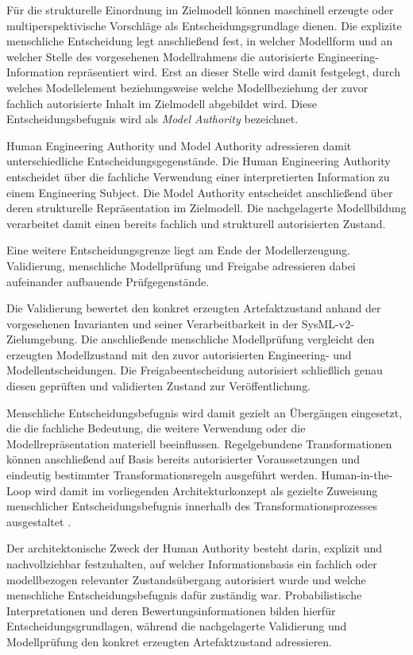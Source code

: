 Für die strukturelle Einordnung im Zielmodell können maschinell erzeugte oder
multiperspektivische Vorschläge als Entscheidungsgrundlage dienen. Die
explizite menschliche Entscheidung legt anschließend fest, in welcher
Modellform und an welcher Stelle des vorgesehenen Modellrahmens die
autorisierte Engineering-Information repräsentiert wird. Erst an dieser
Stelle wird damit festgelegt, durch welches Modellelement beziehungsweise
welche Modellbeziehung der zuvor fachlich autorisierte Inhalt im Zielmodell
abgebildet wird. Diese Entscheidungsbefugnis wird als
\emph{Model Authority} bezeichnet.

Human Engineering Authority und Model Authority adressieren damit
unterschiedliche Entscheidungsgegenstände. Die Human Engineering Authority
entscheidet über die fachliche Verwendung einer interpretierten Information
zu einem Engineering Subject. Die Model Authority entscheidet anschließend
über deren strukturelle Repräsentation im Zielmodell. Die nachgelagerte
Modellbildung verarbeitet damit einen bereits fachlich und strukturell
autorisierten Zustand.

Eine weitere Entscheidungsgrenze liegt am Ende der Modellerzeugung.
Validierung, menschliche Modellprüfung und Freigabe adressieren dabei
aufeinander aufbauende Prüfgegenstände. 

\noindent Die Validierung bewertet den konkret
erzeugten Artefaktzustand anhand der vorgesehenen Invarianten und seiner
Verarbeitbarkeit in der SysML-v2-Zielumgebung. Die anschließende menschliche
Modellprüfung vergleicht den erzeugten Modellzustand mit den zuvor
autorisierten Engineering- und Modellentscheidungen. Die
Freigabeentscheidung autorisiert schließlich genau diesen geprüften und
validierten Zustand zur Veröffentlichung.

Menschliche Entscheidungsbefugnis wird damit gezielt an Übergängen
eingesetzt, die die fachliche Bedeutung, die weitere Verwendung oder die
Modellrepräsentation materiell beeinflussen. Regelgebundene Transformationen
können anschließend auf Basis bereits autorisierter Voraussetzungen und
eindeutig bestimmter Transformationsregeln ausgeführt werden.
Human-in-the-Loop wird damit im vorliegenden Architekturkonzept als gezielte
Zuweisung menschlicher Entscheidungsbefugnis innerhalb des
Transformationsprozesses ausgestaltet
\cite{MosqueiraRey2023,Lazaros2026}.

Der architektonische Zweck der Human Authority besteht darin, explizit und
nachvollziehbar festzuhalten, auf welcher Informationsbasis ein fachlich
oder modellbezogen relevanter Zustandsübergang autorisiert wurde und welche
menschliche Entscheidungsbefugnis dafür zuständig war. Probabilistische
Interpretationen und deren Bewertungsinformationen bilden hierfür
Entscheidungsgrundlagen, während die nachgelagerte Validierung und
Modellprüfung den konkret erzeugten Artefaktzustand adressieren.

